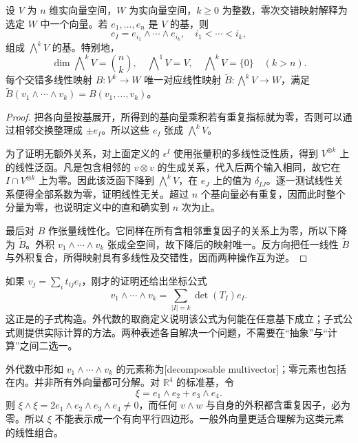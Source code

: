 \begin{proposition}[外代数的基与交错泛性质]\label{b1:prop:app-b-exterior-basis}
设 \(V\) 为 \(n\) 维实向量空间，\(W\) 为实向量空间，\(k\ge0\) 为整数，零次交错映射解释为选定 \(W\) 中一个向量。若 \(e_1,\ldots,e_n\) 是 \(V\) 的基，则
\[
 e_I=e_{i_1}\wedge\cdots\wedge e_{i_k},
 \quad i_1<\cdots<i_k,
\]
组成 \(\bigwedge^kV\) 的基。特别地，
\[
 \dim\bigwedge\nolimits^kV=\binom nk,\quad
 \bigwedge\nolimits^1V=V,\quad
 \bigwedge\nolimits^kV=\{0\}\quad(k>n).
\]
每个交错多线性映射 \(B:V^k\rightarrow W\) 唯一对应线性映射
\(\widetilde B:\bigwedge^kV\rightarrow W\)，满足
\(\widetilde B(v_1\wedge\cdots\wedge v_k)=B(v_1,\ldots,v_k)\)。
\end{proposition}
\begin{proof}
把各向量按基展开，所得到的基向量乘积若有重复指标就为零，否则可以通过相邻交换整理成 \(\pm e_I\)。所以这些 \(e_I\) 张成 \(\bigwedge^kV\)。

为了证明无额外关系，对上面定义的 \(\epsilon^I\) 使用张量积的多线性泛性质，得到 \(V^{\otimes k}\) 上的线性泛函。凡是包含相邻的 \(v\otimes v\) 的生成关系，代入后两个输入相同，故它在 \(I\cap V^{\otimes k}\) 上为零。因此该泛函下降到 \(\bigwedge^kV\)，在 \(e_J\) 上的值为 \(\delta_{IJ}\)。逐一测试线性关系便得全部系数为零，证明线性无关。超过 \(n\) 个基向量必有重复，因而此时整个分量为零，也说明定义中的直和确实到 \(n\) 次为止。

最后对 \(B\) 作张量线性化。它同样在所有含相邻重复因子的关系上为零，所以下降为 \(\widetilde B\)。外积 \(v_1\wedge\cdots\wedge v_k\) 张成全空间，故下降后的映射唯一。反方向把任一线性 \(\widetilde B\) 与外积复合，所得映射具有多线性及交错性，因而两种操作互为逆。
\end{proof}

如果 \(v_j=\sum_i t_{ij}e_i\)，刚才的证明还给出坐标公式
\[
 v_1\wedge\cdots\wedge v_k
   =\sum_{|I|=k}\det(T_I)e_I.
\]
这正是的子式构造。外代数的取商定义说明该公式为何能在任意基下成立；子式公式则提供实际计算的方法。两种表述各自解决一个问题，不需要在“抽象”与“计算”之间二选一。

\ProseParagraphBreak

外代数中形如 \(v_1\wedge\cdots\wedge v_k\) 的元素称为[decomposable multivector]；零元素也包括在内。并非所有外向量都可分解。对 \(\mathbb R^4\) 的标准基，令
\[
 \xi=e_1\wedge e_2+e_3\wedge e_4.
\]
则 \(\xi\wedge\xi=2e_1\wedge e_2\wedge e_3\wedge e_4\ne0\)，而任何 \(v\wedge w\) 与自身的外积都含重复因子，必为零。所以 \(\xi\) 不能表示成一个有向平行四边形。一般外向量更适合理解为这类元素的线性组合。

